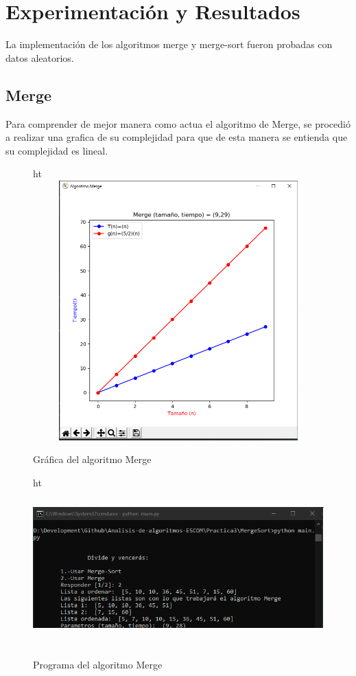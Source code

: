 \documentclass[12pt,twoside]{article}
\begin{document}
\newpage
\vfill
\clearpage
\section{Experimentaci\'on y Resultados}
La implementaci\'on de los algoritmos merge y merge-sort fueron probadas con datos aleatorios.
\subsection{Merge}
Para comprender de mejor manera como actua el algoritmo de Merge, se procedió a realizar una grafica de su complejidad para que de esta manera se entienda que su complejidad es lineal.
\begin{figure}{ht}
    \centering
    \includegraphics[width=13cm, height=10cm]{merge-graph.png}
    \caption{Gr\'afica del algoritmo Merge}
    \label{fig:merge_graph}
\end{figure}


\begin{figure}{ht}
    \centering
    \includegraphics[width=13cm, height=6cm]{merge-program.png}
    \caption{Programa del algoritmo Merge}
    \label{fig:merge_program}
\end{figure}
\end{document}
